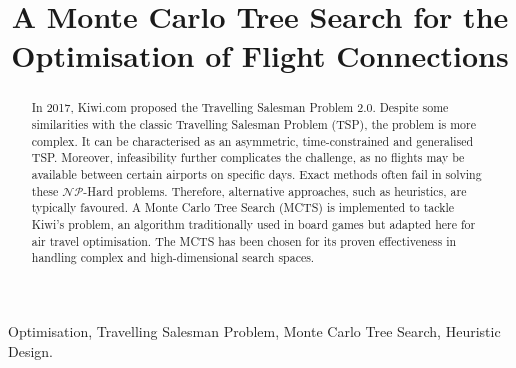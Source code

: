 \documentclass[conference]{IEEEtran}
\begin{document}
\title{A Monte Carlo Tree Search for the
Optimisation of Flight Connections
}

\author{
}


\maketitle

\begin{abstract}
In 2017, Kiwi.com proposed the Travelling Salesman Problem 2.0. Despite some similarities with the classic Travelling Salesman Problem (TSP), the problem is more complex. It can be characterised as an asymmetric, time-constrained and generalised TSP. Moreover, infeasibility further complicates the challenge, as no flights may be available between certain airports on specific days. Exact methods often fail in solving these $\mathcal{NP}$-Hard problems. Therefore, alternative approaches, such as heuristics, are typically favoured. A Monte Carlo Tree Search (MCTS) is implemented to tackle Kiwi's problem, an algorithm traditionally used in board games but adapted here for air travel optimisation. The MCTS has been chosen for its proven effectiveness in handling complex and high-dimensional search spaces.

\end{abstract}

\begin{IEEEkeywords}
Optimisation, Travelling Salesman Problem, Monte Carlo Tree Search, Heuristic Design.
\end{IEEEkeywords}









\end{document}

